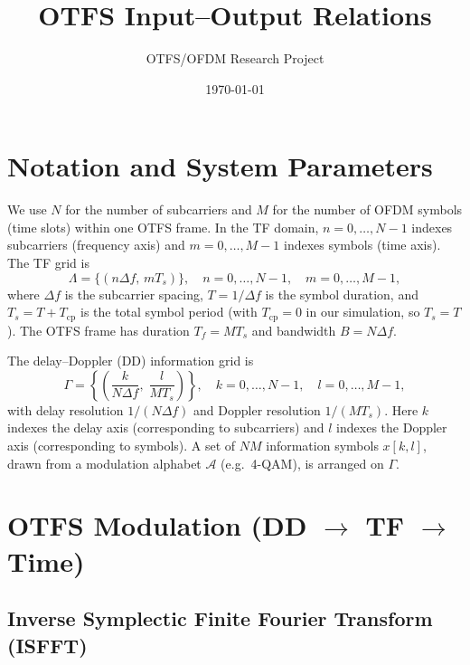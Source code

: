\documentclass[11pt,a4paper]{article}
\title{OTFS Input--Output Relations}
\author{OTFS/OFDM Research Project}
\date{\today}
\newcommand{\deltaf}{\Delta f}
\begin{document}
\maketitle

\section{Notation and System Parameters}

We use $N$ for the number of subcarriers and $M$ for the number of
OFDM symbols (time slots) within one OTFS frame. In the TF domain,
$n=0,\dots,N-1$ indexes subcarriers (frequency axis) and
$m=0,\dots,M-1$ indexes symbols (time axis). The TF grid is
\begin{equation}
  \Lambda = \bigl\{(n\deltaf,\, mT_s)\bigr\},
  \quad n=0,\dots,N-1,\quad m=0,\dots,M-1,
\end{equation}
where $\deltaf$ is the subcarrier spacing, $T = 1/\deltaf$ is the
symbol duration, and $T_s = T + T_{\mathrm{cp}}$ is the total symbol
period (with $T_{\mathrm{cp}}=0$ in our simulation, so $T_s = T$).
The OTFS frame has duration $T_f = MT_s$ and bandwidth
$B = N\deltaf$.

The delay--Doppler (DD) information grid is
\begin{equation}
  \Gamma = \left\{\left(\frac{k}{N\deltaf},\;\frac{l}{MT_s}\right)\right\},
  \quad k=0,\dots,N-1,\quad l=0,\dots,M-1,
\end{equation}
with delay resolution $1/(N\deltaf)$ and Doppler resolution $1/(MT_s)$.
Here $k$ indexes the delay axis (corresponding to subcarriers) and $l$
indexes the Doppler axis (corresponding to symbols).
A set of $NM$ information symbols $x[k,l]$, drawn from a modulation
alphabet $\mathcal{A}$ (e.g.\ 4-QAM), is arranged on $\Gamma$.

\section{OTFS Modulation (DD $\to$ TF $\to$ Time)}

\subsection{Inverse Symplectic Finite Fourier Transform (ISFFT)}
\end{document}
